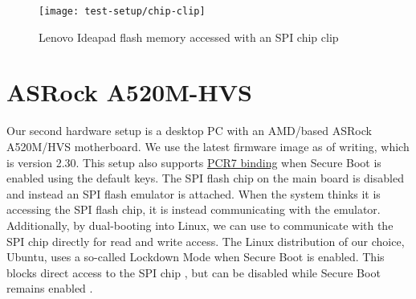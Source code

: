 \begin{figure}[htb]
    \centering
    \texttt{[image: test-setup/chip-clip]}
    \caption{Lenovo Ideapad flash memory accessed with an \acs{SPI} chip clip}
    \label{fig:lenovo-clamp}
\end{figure}

\section{ASRock A520M-HVS}
\label{sec:test-setup:asrock}

Our second hardware setup is a desktop \ac{PC} with an \ac{AMD}\-/based ASRock A520M\-/HVS motherboard.
We use the latest firmware image as of writing, which is version 2.30.
This setup also supports \hyperlink{pcr7-binding}{\ac{PCR}7 binding} when Secure Boot is enabled using the default keys.
The \ac{SPI} flash chip on the main board is disabled and instead an  \ac{SPI} flash emulator is attached.
When the system thinks it is accessing the \ac{SPI} flash chip, it is instead communicating with the emulator.
Additionally, by dual-booting into Linux, we can use  to communicate with the \ac{SPI} chip directly for read and write access.
The Linux distribution of our choice, Ubuntu, uses a so-called Lockdown Mode when Secure Boot is enabled.
This blocks direct access to the \ac{SPI} chip \cite{man-kernel-lockdown}, but can be disabled while Secure Boot remains enabled \cite{disable-kernel-lockdown}.
